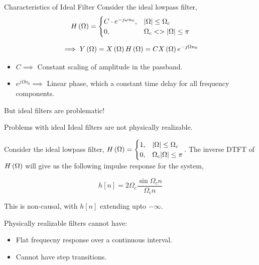 \documentclass[aspectratio=169]{beamer}
\let\olditem\item
\renewcommand{\item}{\setlength{\itemsep}{\fill}\olditem}
\def\lp{\ensuremath\left(}
\def\rp{\ensuremath\right)}
\begin{document}
\begin{frame}[t]{Characteristics of Ideal Filter }
Consider the ideal lowpass filter, 
\[ H\lp \Omega \rp = \begin{cases} C\cdot e^{-j\omega n_0}, & \vert \Omega \vert \leq \Omega_c \\ 0, & \Omega_c < >\vert \Omega \vert \leq \pi \end{cases} \]

\[ \implies Y\lp \Omega \rp = X\lp \Omega \rp H\lp \Omega \rp = C X\lp \Omega \rp e^{-j\Omega n_0} \]
\vspace{0.5cm}

\begin{itemize}
  \item $C \implies $ Constant scaling of amplitude in the passband.
  \item $e^{j \Omega n_0} \implies $ Linear phase, which a constant time delay for all frequency components. 
\end{itemize}

\vspace{1cm}

But ideal filters are problematic!
\end{frame}


\begin{frame}[t]{Problems with ideal}
  Ideal filters are not physically realizable.
  \vspace{0.5cm}

  Consider the ideal lowpass filter, $H\lp \Omega \rp = \begin{cases} 1, & \vert \Omega \vert \leq \Omega_c \\ 0, & \Omega_c \vert \Omega \vert \leq \pi \end{cases}$. The inverse DTFT of $H\lp \Omega \rp$ will give us the following impulse response for the system,

  \[ h[n] = 2 \Omega_c \frac{\sin \Omega_c n}{\Omega_c n} \]

  This is non-causal, with $h[n]$ extending upto $-\infty$.
  \vspace{1cm}

  Physically realizable filters cannot have:
  \begin{itemize}
    \item Flat frequecny response over a continuous interval.
    \item Cannot have step transitions.
  \end{itemize}
\end{frame}
\end{document}
